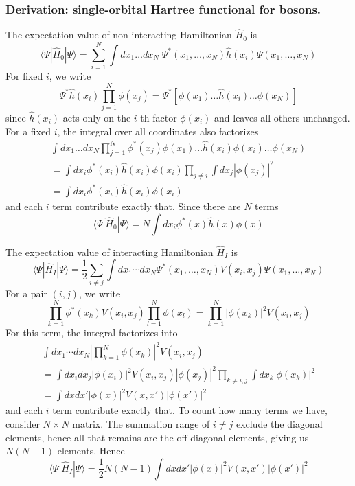 \documentclass[../../../main.tex]{subfiles}
\begin{document}
\subsubsection{Derivation: single-orbital Hartree functional for bosons.}
The expectation value of non-interacting Hamiltonian $\hat{H}_0$ is
\begin{equation*}
  \langle \Psi | \hat{H}_0 | \Psi \rangle =\sum_{i=1}^{N}  \int dx_1 \ldots dx_N \; \Psi^*(x_1, \ldots, x_N) \hat{h}(x_i) \Psi(x_1, \ldots, x_N)
\end{equation*}
For fixed $i$, we write
\begin{equation*}
  \Psi^*\hat{h}(x_i) \prod_{j=1}^{N} \phi(x_j) = \Psi^*\left[ \phi(x_1) \ldots \hat{h}(x_i) \ldots \phi(x_N) \right]
\end{equation*}
since $\hat{h}(x_i)$ acts only on the $i$-th factor $\phi(x_i)$ and leaves all others unchanged.
For a fixed $i$, the integral over all coordinates also factorizes
\begin{multline*}
  \int dx_1 \ldots dx_N \prod_{j=1}^{N} \phi^*(x_j) \phi(x_1) \ldots \hat{h }(x_i) \phi(x_i)\ldots\phi(x_N) \\
  = \int dx_i \phi^*(x_i) \hat{h}(x_i) \phi(x_i) \prod_{j \neq i} \int dx_j |\phi(x_j)|^2\\
  = \int dx_i \phi^*(x_i) \hat{h}(x_i) \phi(x_i)
\end{multline*}
and each $i$ term contribute exactly that.
Since there are $N$  terms
\begin{equation*}
  \langle \Psi | \hat{H}_0 | \Psi \rangle
  = N \int dx_i \phi^*(x) \hat{h}(x) \phi(x)
\end{equation*}

The expectation value of interacting Hamiltonian $\hat{H}_I$ is
\begin{equation*}
  \langle \Psi | \hat{H}_I | \Psi \rangle = \frac{1 }{2}\sum_{i \neq j}  \int dx_1 \cdots dx_N  \Psi ^*(x_1, \ldots, x_N) V(x_i, x_j)  \Psi(x_1, \ldots, x_N)
\end{equation*}
For a pair \( (i, j) \), we write
\begin{equation*}
  \prod_{k=1}^{N} \phi^{*}(x_k) V(x_i, x_j) \prod_{l=1}^{N} \phi(x_l)
  =
  \prod_{k=1}^{N} |\phi(x_k)|^2 V(x_i, x_j)
\end{equation*}
For this term, the integral factorizes into
\begin{multline*}
  \int dx_1 \cdots dx_N |\prod_{k=1}^{N} \phi(x_k)|^2 V(x_i, x_j) \\
  = \int dx_i dx_j |\phi(x_i)|^2 V(x_i, x_j) |\phi(x_j)|^2 \prod_{k \neq i,j} \int dx_k |\phi(x_k)|^2\\
  = \int dx dx' |\phi(x)|^2 V(x,x') |\phi(x')|^2
\end{multline*}
and each $i$ term contribute exactly that.
To count how many terms we have, consider $N \times N$ matrix.
The summation range of $i \neq j$ exclude the diagonal elements, hence all that remains are the off-diagonal elements, giving us $N(N-1)$ elements.
Hence
\begin{equation*}
  \langle \Psi | \hat{H}_I | \Psi \rangle
  =\frac{1}{2}N(N-1 ) \int dx dx' |\phi(x)|^2 V(x,x') |\phi(x')|^2
\end{equation*}
\end{document}
